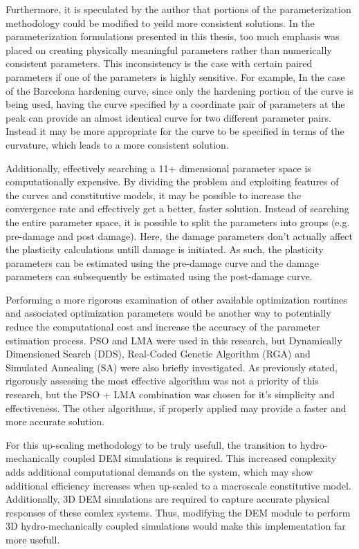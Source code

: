 Furthermore, it is speculated by the author that portions of the parameterization methodology could be modified to yeild more consistent solutions. In the parameterization formulations presented in this thesis, too much emphasis was placed on creating physically meaningful parameters rather than numerically consistent parameters. This inconsistency is the case with certain paired parameters if one of the parameters is highly sensitive. For example, In the case of the Barcelona hardening curve, since only the hardening portion of the curve is being used, having the curve specified by a coordinate pair of parameters at the peak can provide an almost identical curve for two different parameter pairs. Instead it may be more appropriate for the curve to be specified in terms of the curvature, which leads to a more consistent solution.

Additionally, effectively searching a 11+ dimensional parameter space is computationally expensive. By dividing the problem and exploiting features of the curves and constitutive models, it may be possible to increase the convergence rate and effectively get a better, faster solution. Instead of searching the entire parameter space, it is possible to split the parameters into groups (e.g. pre-damage and post damage). Here, the damage parameters don't actually affect the plasticity calculations untill damage is initiated. As such, the plasticity parameters can be estimated using the pre-damage curve and the damage parameters can subsequently be estimated using the post-damage curve.

Performing a more rigorous examination of other available optimization routines and associated optimization parameters would be another way to potentially reduce the computational cost and increase the accuracy of the parameter estimation process. PSO and LMA were used in this research, but Dynamically Dimensioned Search (DDS), 
Real-Coded Genetic Algorithm (RGA) and Simulated Annealing (SA) were also briefly investigated. As previously stated, rigorously assessing the most effective algorithm was not a priority of this research, but the PSO + LMA combination was chosen for it's simplicity and effectiveness. The other algorithms, if properly applied may provide a faster and more accurate solution.
	
For this up-scaling methodology to be truly usefull, the transition to hydro-mechanically coupled DEM simulations is required. This increased complexity adds additional computational demands on the system, which may show additional efficiency increases when up-scaled to a macroscale constitutive model. Additionally, 3D DEM simulations are required to capture accurate physical responses of these comlex systems. Thus, modifying the DEM module to perform 3D hydro-mechanically coupled simulations would make this implementation far more usefull.  

